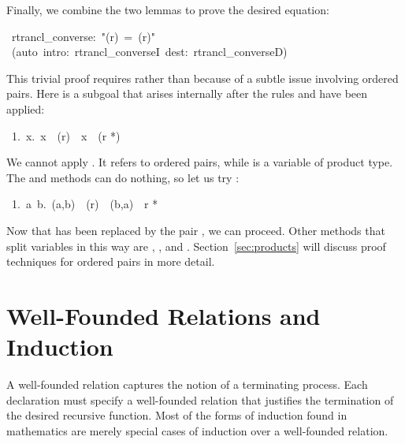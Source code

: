 Finally, we combine the two lemmas to prove the desired equation: 
\begin{isabelle}
\ rtrancl_converse:\ "(r\isasyminverse)\isactrlsup *\ =\ (r\isactrlsup *)\isasyminverse"\isanewline
{}\ (auto\ intro:\ rtrancl_converseI\ dest:\
rtrancl_converseD)
\end{isabelle}

\begin{warn}
This trivial proof requires  rather than  because
of a subtle issue involving ordered pairs.  Here is a subgoal that
arises internally after  the rules
 and  have been applied:
\begin{isabelle}
\ 1.\ \isasymAnd x.\ x\ \isasymin \ (r\isasyminverse )\isactrlsup *\ \isasymLongrightarrow \ x\ \isasymin \ (r\isactrlsup
*)\isasyminverse
\end{isabelle}
\par\noindent
We cannot apply \@.  It refers to
ordered pairs, while  is a variable of product type.
The  and  methods can do nothing, so let us try
\isa{clarify}:
\begin{isabelle}
\ 1.\ \isasymAnd a\ b.\ (a,b)\ \isasymin \ (r\isasyminverse )\isactrlsup *\ \isasymLongrightarrow \ (b,a)\ \isasymin \ r\isactrlsup
*
\end{isabelle}
Now that  has been replaced by the pair , we can
proceed.  Other methods that split variables in this way are ,
\isa{auto}, \isa{fast} and \isa{best}.  Section~\ref{sec:products} will discuss proof
techniques for ordered pairs in more detail.
\end{warn}


\section{Well-Founded Relations and Induction}
\label{sec:Well-founded}

%
A well-founded relation captures the notion of a terminating process. 
Each \commdx{recdef}
declaration must specify a well-founded relation that
justifies the termination of the desired recursive function.  Most of the
forms of induction found in mathematics are merely special cases of
induction over a well-founded relation.

